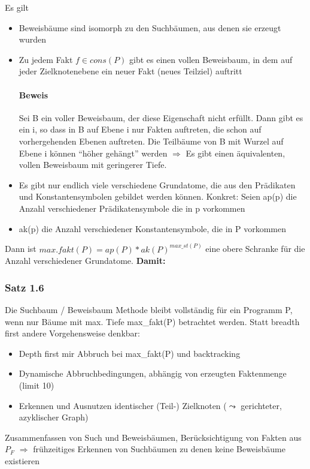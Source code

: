 \documentclass[12pt, a4paper]{article}
\begin{document}
Es gilt
\begin{itemize}
\item Beweisbäume sind isomorph zu den Suchbäumen, aus denen sie erzeugt wurden
\item Zu jedem Fakt $f \in cons(P)$ gibt es einen vollen Beweisbaum, in dem auf jeder Zielknotenebene ein neuer Fakt (neues Teilziel) auftritt
\paragraph{Beweis}
Sei B ein voller Beweisbaum, der diese Eigenschaft nicht erfüllt.
Dann gibt es ein i, so dass in B auf Ebene i nur Fakten auftreten, die schon auf vorhergehenden Ebenen auftreten. Die Teilbäume von B mit Wurzel auf Ebene i können ``höher gehängt'' werden $\Rightarrow$ Es gibt einen äquivalenten, vollen Beweisbaum mit geringerer Tiefe.

\item Es gibt nur endlich viele verschiedene Grundatome, die aus den Prädikaten und Konstantensymbolen gebildet werden können. Konkret: Seien ap(p) die Anzahl verschiedener Prädikatensymbole die in p vorkommen
\item ak(p) die Anzahl verschiedener Konstantensymbole, die in P vorkommen
\end{itemize}

Dann ist $max. fakt(P) = ap(P) * ak(P)^{max\_st(P)}$ eine obere Schranke für die Anzahl verschiedener Grundatome. \textbf{Damit:}
	
\subsubsection*{Satz 1.6} Die Suchbaum / Beweisbaum Methode bleibt vollständig für ein Programm P, wenn nur Bäume mit max. Tiefe max\_fakt(P) betrachtet werden.
Statt breadth first andere Vorgehensweise denkbar:

\begin{itemize}
	\item Depth first mir Abbruch bei max\_fakt(P) und backtracking
	\item Dynamische Abbruchbedingungen, abhängig von erzeugten Faktenmenge (limit 10)
	\item Erkennen und Ausnutzen identischer (Teil-) Zielknoten ($\leadsto$ gerichteter, azyklischer Graph)
\end{itemize}

Zusammenfassen von Such und Beweisbäumen, Berücksichtigung von Fakten aus $P_F$ $\Rightarrow$ frühzeitiges Erkennen von Suchbäumen zu denen keine Beweisbäume existieren
\end{document}
